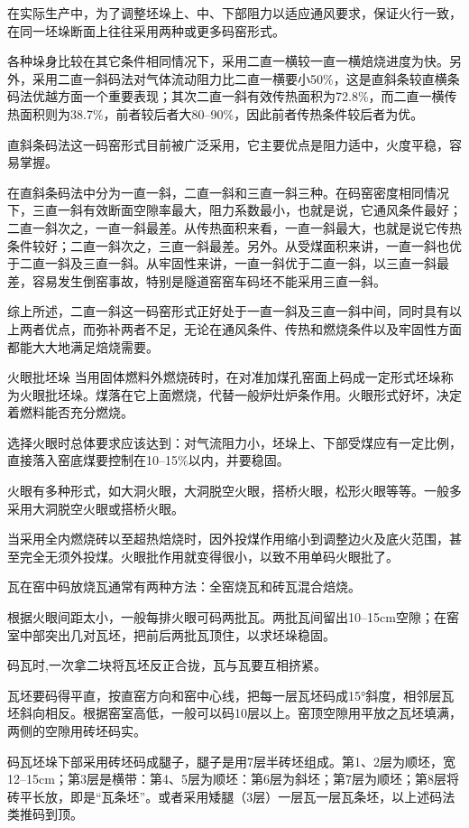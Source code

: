 \documentclass{ctexbook}
\begin{document}
在实际生产中，为了调整坯垛上、中、下部阻力以适应通风要求，保证火行一致，在同一坯垛断面上往往采用两种或更多码窑形式。

各种垛身比较在其它条件相同情况下，采用二直一横较一直一横焙烧进度为快。另外，采用二直一斜码法对气体流动阻力比二直一横要小50\%，这是直斜条较直横条码法优越方面一个重要表现；其次二直一斜有效传热面积为72.8\%，而二直一横传热面积则为38.7\%，前者较后者大80--90\%，因此前者传热条件较后者为优。

直斜条码法这一码窑形式目前被广泛采用，它主要优点是阻力适中，火度平稳，容易掌握。

在直斜条码法中分为一直一斜，二直一斜和三直一斜三种。在码窑密度相同情况下，三直一斜有效断面空隙率最大，阻力系数最小，也就是说，它通风条件最好；二直一斜次之，一直一斜最差。从传热面积来看，一直一斜最大，也就是说它传热条件较好；二直一斜次之，三直一斜最差。另外。从受煤面积来讲，一直一斜也优于二直一斜及三直一斜。从牢固性来讲，一直一斜优于二直一斜，以三直一斜最差，容易发生倒窑事故，特别是隧道窑窑车码坯不能采用三直一斜。

综上所述，二直一斜这一码窑形式正好处于一直一斜及三直一斜中间，同时具有以上两者优点，而弥补两者不足，无论在通风条件、传热和燃烧条件以及牢固性方面都能大大地满足焙烧需要。

火眼批坯垛 当用固体燃料外燃烧砖时，在对准加煤孔窑面上码成一定形式坯垛称为火眼批坯垛。煤落在它上面燃烧，代替一般炉灶炉条作用。火眼形式好坏，决定着燃料能否充分燃烧。

选择火眼时总体要求应该达到：对气流阻力小，坯垛上、下部受煤应有一定比例，直接落入窑底煤要控制在10--15\%以内，并要稳固。

火眼有多种形式，如大洞火眼，大洞脱空火眼，搭桥火眼，松形火眼等等。一般多采用大洞脱空火眼或搭桥火眼。

当采用全内燃烧砖以至超热焙烧时，因外投煤作用缩小到调整边火及底火范围，甚至完全无须外投煤。火眼批作用就变得很小，以致不用单码火眼批了。

瓦在窑中码放烧瓦通常有两种方法：全窑烧瓦和砖瓦混合焙烧。

根据火眼间距太小，一般每排火眼可码两批瓦。两批瓦间留出10--15cm空隙；在窑室中部突出几对瓦坯，把前后两批瓦顶住，以求坯垛稳固。

码瓦时,一次拿二块将瓦坯反正合拢，瓦与瓦要互相挤紧。

瓦坯要码得平直，按直窑方向和窑中心线，把每一层瓦坯码成15°斜度，相邻层瓦坯斜向相反。根据窑室高低，一般可以码10层以上。窑顶空隙用平放之瓦坯填满，两侧的空隙用砖坯码实。

码瓦坯垛下部采用砖坯码成腿子，腿子是用7层半砖坯组成。第1、2层为顺坯，宽12--15cm；第3层是横带：第4、5层为顺坯：第6层为斜坯；第7层为顺坯；第8层将砖平长放，即是“瓦条坯”。或者采用矮腿（3层）一层瓦一层瓦条坯，以上述码法类推码到顶。
\end{document}
